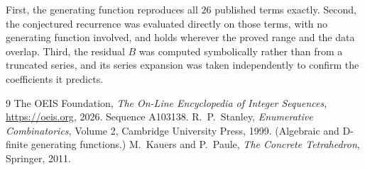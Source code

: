 \documentclass[11pt,a4paper]{article}
\theoremstyle{plain}
\theoremstyle{definition}
\begin{document}
First, the generating function reproduces all $26$ published terms exactly. Second,
the conjectured recurrence was evaluated directly on those terms, with no generating function
involved, and holds wherever the proved range and the data overlap. Third, the residual $B$ was
computed symbolically rather than from a truncated series, and its series expansion was taken
independently to confirm the coefficients it predicts.

\begin{thebibliography}{9}
 The OEIS Foundation, \emph{The On-Line Encyclopedia of Integer Sequences},
\url{https://oeis.org}, 2026. Sequence A103138.
 R.~P.~Stanley, \emph{Enumerative Combinatorics}, Volume 2, Cambridge
University Press, 1999. (Algebraic and D-finite generating functions.)
 M.~Kauers and P.~Paule, \emph{The Concrete Tetrahedron}, Springer, 2011.
\end{thebibliography}
\end{document}
